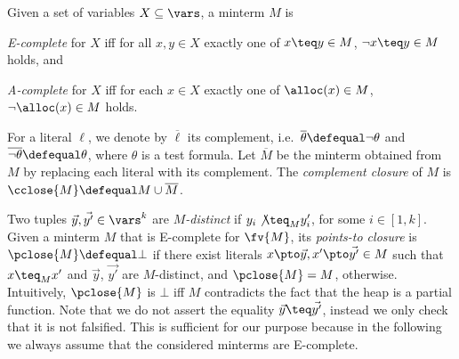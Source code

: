 
Given a set of variables $X \subseteq \vars$, a minterm $M$
is \begin{inparaenum}[(1)]
\item \emph{E-complete} for $X$ iff for all $x,y \in X$ exactly one of
  $x \teq y \in M$, $\neg x \teq y \in M$ holds, and
%
\item \emph{A-complete} for $X$ iff for each $x \in X$ exactly one of
  $\alloc(x) \in M$, $\neg\alloc(x) \in M$ holds.
\end{inparaenum}


For a literal $\ell$, we denote by $\overline{\ell}$ its complement,
i.e.\ $\overline{\theta} \defequal \neg \theta$ and $\overline{\neg
  \theta} \defequal \theta$, where $\theta$ is a test formula. Let
$\overline{M}$ be the minterm obtained from $M$ by replacing each
literal with its complement. The \emph{complement closure} of $M$ is
$\cclose{M} \defequal M \cup \overline{M}$.

Two tuples $\vec{y}, \vec{y'} \in \vars^k$ are \emph{$M$-distinct} if
$y_i \not\teq_M y'_i$, for some $i \in [1,k]$.  Given a minterm $M$
that is E-complete for $\fv{M}$, its \emph{points-to closure} is
\(\pclose{M} \defequal \bot\) if there exist literals $x \pto \vec{y},
x' \pto \vec{y'} \in M$ such that $x \teq_M x'$ and $\vec{y}$,
$\vec{y'}$ are $M$-distinct, and $\pclose{M} = M$, otherwise.
Intuitively, $\pclose{M}$ is $\bot$ iff $M$ contradicts the fact that
the heap is a partial function. Note that we do not assert the
equality $\vec{y} \teq \vec{y'}$, instead we only check that it is not
falsified. This is sufficient for our purpose because in the following
we always assume that the considered minterms are E-complete.

